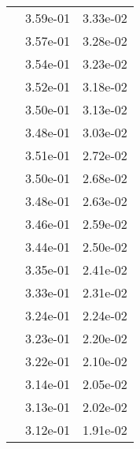\begin{table}
\begin{tabular}{c|cc|}
\multicolumn{1}{|c|}{} & \multicolumn{1}{|c|}{  3.59e-01} & \multicolumn{1}{|c|}{  3.33e-02} \\ 
\multicolumn{1}{|c|}{} & \multicolumn{1}{|c|}{  3.57e-01} & \multicolumn{1}{|c|}{  3.28e-02} \\ 
\multicolumn{1}{|c|}{} & \multicolumn{1}{|c|}{  3.54e-01} & \multicolumn{1}{|c|}{  3.23e-02} \\ 
\multicolumn{1}{|c|}{} & \multicolumn{1}{|c|}{  3.52e-01} & \multicolumn{1}{|c|}{  3.18e-02} \\ 
\multicolumn{1}{|c|}{} & \multicolumn{1}{|c|}{  3.50e-01} & \multicolumn{1}{|c|}{  3.13e-02} \\ 
\multicolumn{1}{|c|}{} & \multicolumn{1}{|c|}{  3.48e-01} & \multicolumn{1}{|c|}{  3.03e-02} \\ 
\multicolumn{1}{|c|}{} & \multicolumn{1}{|c|}{  3.51e-01} & \multicolumn{1}{|c|}{  2.72e-02} \\ 
\multicolumn{1}{|c|}{} & \multicolumn{1}{|c|}{  3.50e-01} & \multicolumn{1}{|c|}{  2.68e-02} \\ 
\multicolumn{1}{|c|}{} & \multicolumn{1}{|c|}{  3.48e-01} & \multicolumn{1}{|c|}{  2.63e-02} \\ 
\multicolumn{1}{|c|}{} & \multicolumn{1}{|c|}{  3.46e-01} & \multicolumn{1}{|c|}{  2.59e-02} \\ 
\multicolumn{1}{|c|}{} & \multicolumn{1}{|c|}{  3.44e-01} & \multicolumn{1}{|c|}{  2.50e-02} \\ 
\multicolumn{1}{|c|}{} & \multicolumn{1}{|c|}{  3.35e-01} & \multicolumn{1}{|c|}{  2.41e-02} \\ 
\multicolumn{1}{|c|}{} & \multicolumn{1}{|c|}{  3.33e-01} & \multicolumn{1}{|c|}{  2.31e-02} \\ 
\multicolumn{1}{|c|}{} & \multicolumn{1}{|c|}{  3.24e-01} & \multicolumn{1}{|c|}{  2.24e-02} \\ 
\multicolumn{1}{|c|}{} & \multicolumn{1}{|c|}{  3.23e-01} & \multicolumn{1}{|c|}{  2.20e-02} \\ 
\multicolumn{1}{|c|}{} & \multicolumn{1}{|c|}{  3.22e-01} & \multicolumn{1}{|c|}{  2.10e-02} \\ 
\multicolumn{1}{|c|}{} & \multicolumn{1}{|c|}{  3.14e-01} & \multicolumn{1}{|c|}{  2.05e-02} \\ 
\multicolumn{1}{|c|}{} & \multicolumn{1}{|c|}{  3.13e-01} & \multicolumn{1}{|c|}{  2.02e-02} \\ 
\multicolumn{1}{|c|}{} & \multicolumn{1}{|c|}{  3.12e-01} & \multicolumn{1}{|c|}{  1.91e-02} \\ 

\end{tabular}
\end{table}
